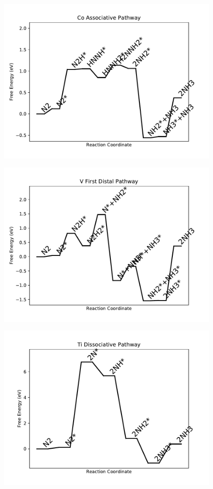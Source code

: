 \begin{figure}
\centering
\includegraphics[width=0.8\linewidth]{data/plots/Co_associative.pdf}
\end{figure}

\begin{figure}
\centering
\includegraphics[width=0.8\linewidth]{data/plots/V_distal_1.pdf}
\end{figure}

\begin{figure}
\centering
\includegraphics[width=0.8\linewidth]{data/plots/Ti_dissociative.pdf}
\end{figure}

